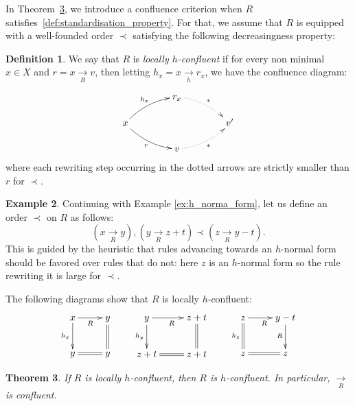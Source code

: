 \documentclass[10pt]{easychair}
\newtheorem{theorem}{Theorem}[section]
\theoremstyle{definition}
\newtheorem{definition}[theorem]{Definition}
\newtheorem{example}[theorem]{Example}
\newcommand\rewR{\underset{R}{\longrightarrow}}
\newcommand\rewh{\underset{h}{\longrightarrow}}
\begin{document}
In Theorem~\ref{thm:confluence_criterion}, we introduce a confluence
criterion when $R$ satisfies~\ref{def:standardisation_property}. For
that, we assume that $R$ is equipped with a well-founded order $\prec$
satisfying the following decreasingness property:

\begin{definition}\label{proper:decreasingness_property}
  We say that $R$ is \emph{locally $h$-confluent} if for every non
  minimal $x\in X$ and $r=x\rewR v$, then letting $h_x=x\rewh r_x$, we
  have the confluence diagram:
  
  \[
    \xymatrix @C = 4em @R = 1.5em{
      &
      r_x
      \ar@{.>}@/^/ [rd] ^{*}
      & \\
      x
      \ar@/^/ [ru] ^{h_x}
      \ar@/_/ [rd] _{r}
      &
      &
      v'
      \\
      &
      v
      \ar@{.>}@/_/  [ru] _{*}
      &
    }
  \]
  where each rewriting step occurring in the dotted arrows are strictly
  smaller than $r$ for $\prec$.
\end{definition}

\begin{example}
Continuing with Example \ref{ex:h_norma_form}, let us define an order $\prec$ on $R$ as follows:
\[
(x \rewR y), (y \rewR z + t) \prec (z \rewR y - t).
\]
This is guided by the heuristic that rules advancing towards an $h$-normal form should be favored over rules that do not: here $z$ is an $h$-normal form so the rule rewriting it is large for $\prec$.

The following diagrams show that $R$ is locally $h$-confluent:
\[
   \xymatrix @C = 2.5em @R = 2.5em{
   x \ar [r] _{R}  
    \ar [d] _{h_x}   
   & y 
   \ar@{=} [d]
   \\
    y
    \ar@{=} [r]
    & y
    }
    \qquad
   \xymatrix @C = 2.5em @R = 2.5em{
   y \ar [r] _{R}  
    \ar [d] _{h_y}   
   & z + t
   \ar@{=} [d]
   \\
    z + t
    \ar@{=} [r]
    & z + t
    }
     \qquad
   \xymatrix @C = 2.5em @R = 2.5em{
   z \ar [r] _{R}  
    \ar@{=} [d] _{h_z}   
   & y - t
   \ar [d] _{R}
   \\
    z
    \ar@{=} [r]
    & z
    }
\]    
\end{example}


\begin{theorem}\label{thm:confluence_criterion}
  If $R$ is locally $h$-confluent, then $R$ is $h$-confluent. In particular, $\rewR$ is confluent.
\end{theorem}
\end{document}
